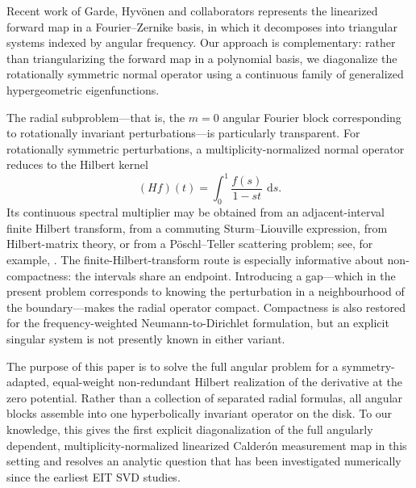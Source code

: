 \IfFileExists{iopjournal.cls}{\documentclass{iopjournal}}{\documentclass{iopjournal-draft}}
\theoremstyle{definition}
\theoremstyle{remark}
\newcommand{\dd}{\,\mathrm d}
\numberwithin{equation}{section}
\begin{document}
 Recent work of Garde, Hyv\"onen and collaborators \cite{garde2024linearized, autio2025linearization}    represents the linearized forward map in a Fourier–Zernike basis, in which it decomposes into triangular systems indexed by angular frequency. Our approach is complementary: rather than triangularizing the forward map in a polynomial basis, we diagonalize the rotationally symmetric normal operator using a continuous family of generalized hypergeometric eigenfunctions.

The radial subproblem---that is, the $m=0$ angular Fourier block corresponding to rotationally invariant perturbations---is particularly transparent.  For rotationally symmetric perturbations, a multiplicity-normalized normal operator reduces to the Hilbert kernel \cite{Lionheart2026AtLast}
\begin{equation}
 (Hf)(t)=\int_0^1\frac{f(s)}{1-st}\,\dd s.
 \label{eq:radial-hilbert}
\end{equation}
Its continuous spectral multiplier may be obtained from an adjacent-interval finite Hilbert transform, from a commuting Sturm--Liouville expression, from Hilbert-matrix theory, or from a P\"oschl--Teller scattering problem; see, for example, \cite{KatsevichTovbis2016,AlemanMontesSarafoleanu2012,MontesVirtanen2025}.  The finite-Hilbert-transform route is especially informative about non-compactness: the intervals share an endpoint.  Introducing a gap---which in the present problem corresponds to knowing the perturbation in a neighbourhood of the boundary---makes the radial operator compact.  Compactness is also restored for the frequency-weighted Neumann-to-Dirichlet formulation, but an explicit singular system is not presently known in either variant.

The purpose of this paper is to solve the full angular problem for a symmetry-adapted, equal-weight non-redundant Hilbert realization of the derivative at the zero potential.  Rather than a  collection of separated radial formulas,  all angular blocks assemble into one hyperbolically invariant operator on the disk.  To our knowledge, this gives the first explicit diagonalization of the full angularly dependent, multiplicity-normalized linearized Calder\'on measurement map in this setting and resolves an analytic question that has been investigated numerically since the earliest EIT SVD studies.
\end{document}
